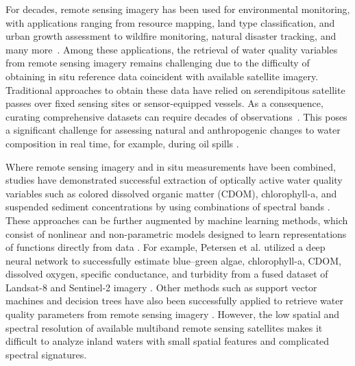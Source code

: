 For decades, remote sensing imagery has been used for environmental monitoring, with applications ranging from resource mapping, land type classification, and urban growth assessment to wildfire monitoring, natural disaster tracking, and many more~\cite{melesse2007remote, joyce2009review}. Among these applications, the retrieval of water quality variables from remote sensing imagery remains challenging due to the difficulty of obtaining in situ reference data coincident with available satellite imagery. Traditional approaches to obtain these data have relied on serendipitous satellite passes over fixed sensing sites or sensor-equipped vessels. As a consequence, curating comprehensive datasets can require decades of observations~\cite{aurin2018remote, ross2019aquasat}. This poses a significant challenge for assessing natural and anthropogenic changes to water composition in real time, for example, during oil spills \cite{fingas2017review}.

Where remote sensing imagery and in situ measurements have been combined, studies have demonstrated successful extraction of optically active water quality variables such as colored dissolved organic matter (CDOM), chlorophyll-a, and suspended sediment concentrations by using combinations of spectral bands \cite{remote-sensing-finland,bonansea2015using, absalon2023detection}. These approaches can be further augmented by machine learning methods, which consist of nonlinear and non-parametric models designed to learn representations of functions directly from data \cite{lary2010artificial}. For example, Petersen et al. utilized a deep neural network to successfully estimate blue--green algae, chlorophyll-a, CDOM, dissolved oxygen, specific conductance, and turbidity from a fused dataset of Landsat-8 and Sentinel-2 imagery \cite{peterson2020deep}. Other methods such as support vector machines and decision trees have also been successfully applied to retrieve water quality parameters from remote sensing imagery \cite{belgiu2016random,sagan2020monitoring}. However, the low spatial and spectral resolution of available multiband remote sensing satellites makes it difficult to analyze inland waters with small spatial features and complicated spectral signatures. 

